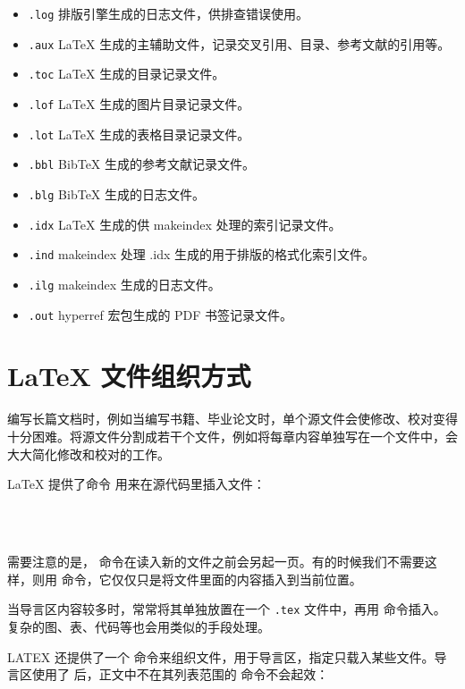 \begin{itemize}
    \item \lstinline{.log} 排版引擎生成的日志文件，供排查错误使用。
    \item \lstinline{.aux} \LaTeX{} 生成的主辅助文件，记录交叉引用、目录、参考文献的引用等。
    \item \lstinline{.toc} \LaTeX{} 生成的目录记录文件。
    \item \lstinline{.lof} \LaTeX{} 生成的图片目录记录文件。
    \item \lstinline{.lot} \LaTeX{} 生成的表格目录记录文件。
    \item \lstinline{.bbl} BibTeX 生成的参考文献记录文件。
    \item \lstinline{.blg} BibTeX 生成的日志文件。
    \item \lstinline{.idx} \LaTeX{} 生成的供 makeindex 处理的索引记录文件。
    \item \lstinline{.ind} makeindex 处理 .idx 生成的用于排版的格式化索引文件。
    \item \lstinline{.ilg} makeindex 生成的日志文件。
    \item \lstinline{.out} hyperref 宏包生成的 PDF 书签记录文件。
\end{itemize}

\section{\LaTeX{} 文件组织方式}\label{sec:latexfileorganization}

编写长篇文档时，例如当编写书籍、毕业论文时，单个源文件会使修改、校对变得十分困难。将源文件分割成若干个文件，例如将每章内容单独写在一个文件中，会大大简化修改和校对的工作。

\LaTeX{} 提供了命令 \lstinline{} 用来在源代码里插入文件：

\begin{lstlisting}



\end{lstlisting}

需要注意的是，\lstinline{} 命令在读入新的文件之前会另起一页。有的时候我们不需要这样，则用\lstinline{} 命令，它仅仅只是将文件里面的内容插入到当前位置。

当导言区内容较多时，常常将其单独放置在一个 \lstinline{.tex} 文件中，再用 \lstinline{} 命令插入。复杂的图、表、代码等也会用类似的手段处理。

LATEX 还提供了一个 \lstinline{} 命令来组织文件，用于导言区，指定只载入某些文件。导言区使用了 \lstinline{} 后，正文中不在其列表范围的 \lstinline{}命令不会起效：
\begin{lstlisting}

\end{lstlisting}

